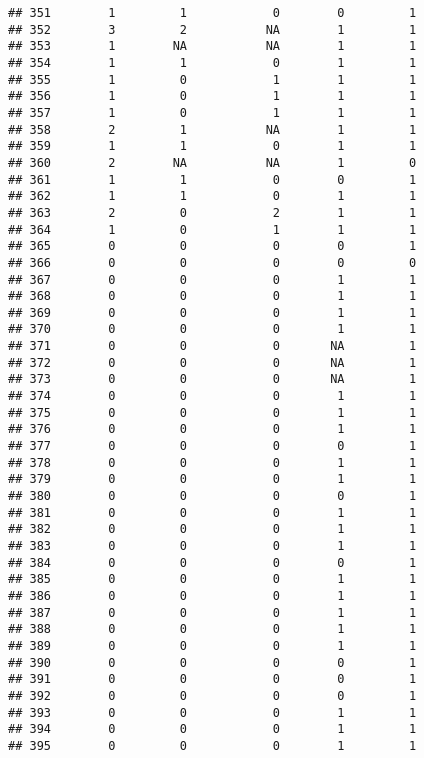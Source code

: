 \documentclass[
]{article}
\begin{document}
\begin{verbatim}
## 351        1         1            0        0         1
## 352        3         2           NA        1         1
## 353        1        NA           NA        1         1
## 354        1         1            0        1         1
## 355        1         0            1        1         1
## 356        1         0            1        1         1
## 357        1         0            1        1         1
## 358        2         1           NA        1         1
## 359        1         1            0        1         1
## 360        2        NA           NA        1         0
## 361        1         1            0        0         1
## 362        1         1            0        1         1
## 363        2         0            2        1         1
## 364        1         0            1        1         1
## 365        0         0            0        0         1
## 366        0         0            0        0         0
## 367        0         0            0        1         1
## 368        0         0            0        1         1
## 369        0         0            0        1         1
## 370        0         0            0        1         1
## 371        0         0            0       NA         1
## 372        0         0            0       NA         1
## 373        0         0            0       NA         1
## 374        0         0            0        1         1
## 375        0         0            0        1         1
## 376        0         0            0        1         1
## 377        0         0            0        0         1
## 378        0         0            0        1         1
## 379        0         0            0        1         1
## 380        0         0            0        0         1
## 381        0         0            0        1         1
## 382        0         0            0        1         1
## 383        0         0            0        1         1
## 384        0         0            0        0         1
## 385        0         0            0        1         1
## 386        0         0            0        1         1
## 387        0         0            0        1         1
## 388        0         0            0        1         1
## 389        0         0            0        1         1
## 390        0         0            0        0         1
## 391        0         0            0        0         1
## 392        0         0            0        0         1
## 393        0         0            0        1         1
## 394        0         0            0        1         1
## 395        0         0            0        1         1

\end{verbatim}
\end{document}
